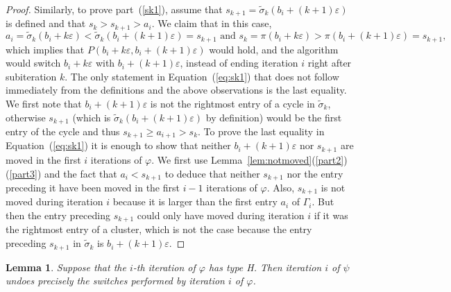 \documentclass[11pt]{amsart}
\newtheorem{lemma}[theorem]{Lemma}
\newcommand\beq{\begin{equation}}
\newcommand\eeq{\end{equation}}
\newcommand\wt{\widetilde}
\newcommand\bij{\varphi}
\newcommand\inv{\psi}
\newcommand\eps{\varepsilon}
\newcommand\sigm{\wt\sigma}
\begin{document}
\begin{proof}
Similarly, to prove part~(\ref{sk1}), assume that $s_{k+1}=\sigm_k(b_i+(k{+}1)\eps)$ is defined and that $s_k>s_{k+1}>a_i$. We claim that in this case,
\beq\label{eq:sk1} a_i=\sigm_k(b_i+k\eps)<\sigm_k(b_i+(k{+}1)\eps)=s_{k+1} \mbox{ and } s_k=\pi(b_i+k\eps)>\pi(b_i+(k{+}1)\eps)=s_{k+1},\eeq
which implies that $P(b_i+k\eps,b_i+(k{+}1)\eps)$ would hold, and the algorithm would switch $b_i+k\eps$ with $b_i+(k{+}1)\eps$,
instead of ending iteration $i$ right after subiteration $k$. The only statement in
Equation~(\ref{eq:sk1}) that does not follow immediately from the definitions and the above observations is the last equality.
We first note that $b_i+(k{+}1)\eps$ is not the rightmost entry of a cycle in $\sigm_k$, otherwise
$s_{k+1}$ (which is $\sigm_k(b_i+(k{+}1)\eps)$ by definition) would be the first entry of the cycle and thus $s_{k+1}\ge a_{i+1}>s_k$.
To prove the last equality in Equation~(\ref{eq:sk1}) it is enough to show that neither $b_i+(k{+}1)\eps$ nor $s_{k+1}$ are moved in the first $i$ iterations of $\bij$.
We first use Lemma~\ref{lem:notmoved}(\ref{part2})(\ref{part3}) and the fact that $a_i<s_{k+1}$ to deduce that
neither $s_{k+1}$ nor the entry preceding it have been moved in the first $i-1$ iterations of $\bij$. Also, $s_{k+1}$ is not moved during iteration
$i$ because it is larger than the first entry $a_i$ of $\Gamma_i$. But then the entry preceding $s_{k+1}$ could only have moved during iteration $i$ if it was the rightmost entry of a cluster,
which is not the case because the entry preceding $s_{k+1}$ in $\sigm_k$ is $b_i+(k{+}1)\eps$.
\end{proof}


\begin{lemma}\label{lem:bijinvH}
Suppose that the $i$-th iteration of $\bij$ has type H.
Then iteration $i$ of $\inv$ undoes precisely the switches performed by iteration $i$ of $\bij$.
\end{lemma}
\end{document}
